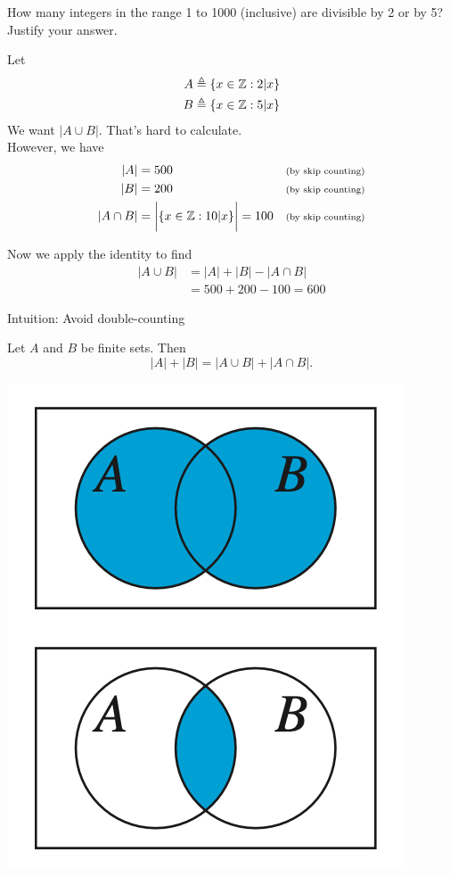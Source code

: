 \documentclass[10pt]{beamer}
\begin{document}
\begin{frame}
\footnotesize 
 \begin{mygreenbox}[title=Reading Quiz (Set Operations)]
How many integers in the range 1 to 1000 (inclusive) are divisible by 2 or by 5?  Justify your answer.
\end{mygreenbox}

\vfill 
 \begin{myredbox}[title=Sketch of Solution]
Let
%
\begin{align*}
A &\triangleq \{ {x \in \mathbb{Z} : 2|x} \} \\
B &\triangleq \{ {x \in \mathbb{Z} : 5|x} \} 
\end{align*}
%
We want $|A \cup B|$.  That's hard to calculate. \\

However, we have
\begin{align*}
|A| &= 500 && \text{\scriptsize{{(by skip counting)}}} \\
|B| &= 200 && \text{\scriptsize{{(by skip counting)}}} \\
|A \cap B| &= \bigg| \{ {x \in \mathbb{Z} : 10|x} \} \bigg| = 100 && \text{\scriptsize{{(by skip counting)}}} 
\end{align*}

Now we apply the identity to find
\begin{align*}
|A \cup B|  &= |A| + |B| - |A \cap B| \\
			&= 500 + 200 - 100 = 600
\end{align*}

\end{myredbox}


\end{frame}

\begin{frame}{Intuition: Avoid double-counting}

\begin{myyellowbox}[title=Proposition 12.4 (Scheinerman)]
Let $A$ and $B$ be finite sets.  Then %
\[ |A| + |B| = |A \cup B| + |A \cap B|. \]
\end{myyellowbox}
\vfill 

\begin{center}
\includegraphics[width=.4\textwidth]{images/double_counting.png}	
\end{center}
	
\end{frame}
\end{document}
